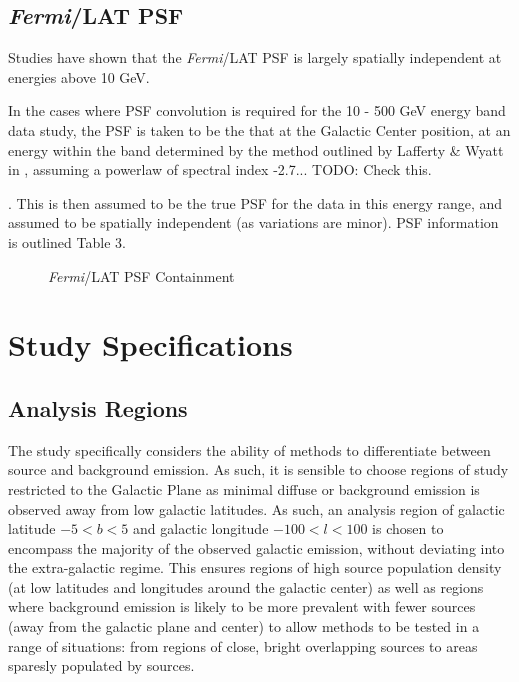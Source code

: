 \documentclass{PoS}
\begin{document}
\subsection{\textit{Fermi}/LAT PSF}


Studies have shown that the \textit{Fermi}/LAT PSF is largely spatially independent at energies above 10 GeV.


In the cases where PSF convolution is required for the 10 - 500 GeV energy band data study, the PSF is taken to be the that at the Galactic Center position, at an energy within the band determined by the method outlined by Lafferty \& Wyatt in %
, assuming a powerlaw of spectral index -2.7... TODO: Check this.

. This is then assumed to be the true PSF for the data in this energy range, and assumed to be spatially independent (as variations are minor). PSF information is outlined Table 3.


\begin{figure}
\centering
{}
\caption{\textit{Fermi}/LAT PSF Containment}
\end{figure}


\section{Study Specifications}

\subsection{Analysis Regions}

The study specifically considers the ability of methods to differentiate between source and background emission. As such, it is sensible to choose regions of study restricted to the Galactic Plane as minimal diffuse or background emission is observed away from low galactic latitudes. As such, an analysis region of galactic latitude $-5 < b < 5$ and galactic longitude $-100 < l < 100$ is chosen to encompass the majority of the observed galactic emission, without deviating into the extra-galactic regime. This ensures regions of high source population density (at low latitudes and longitudes around the galactic center) as well as regions where background emission is likely to be more prevalent with fewer sources (away from the galactic plane and center) to allow methods to be tested in a range of situations: from regions of close, bright overlapping sources to areas sparesly populated by sources.
\end{document}
